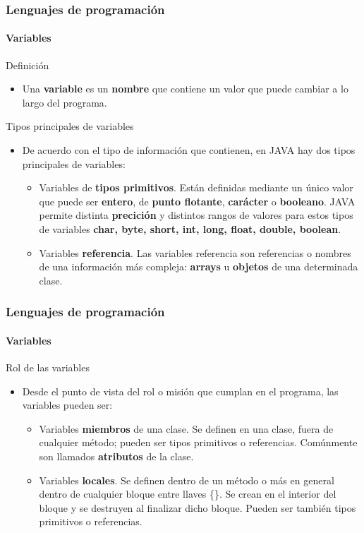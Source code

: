\documentclass{beamer}
\begin{document}
		\begin{frame}
			\frametitle{Lenguajes de programaci\'on}
			\framesubtitle{Variables}

			{\scriptsize
			\begin{exampleblock}{Definici\'on}
				\begin{itemize}
  					\item Una \textbf{variable} es un \textbf{nombre} que contiene un valor que puede cambiar a lo largo del programa.
				\end{itemize}
			\end{exampleblock}

			\begin{block}{Tipos principales de variables}
				\begin{itemize}
					\item De acuerdo con el tipo de informaci\'on que contienen, en JAVA hay dos tipos principales de variables:
					\begin{itemize}
						\item {\scriptsize Variables de \textbf{tipos primitivos}. Est\'an definidas mediante un \'unico valor que puede ser \textbf{entero}, de \textbf{punto flotante}, \textbf{car\'acter} o \textbf{booleano}. JAVA permite distinta \textbf{precici\'on} y distintos rangos de valores para estos tipos de variables \textbf{char, byte, short, int, long, float, double, boolean}.}
						\item {\scriptsize Variables \textbf{referencia}. Las variables referencia son referencias o nombres de una informaci\'on m\'as compleja: \textbf{arrays} u \textbf{objetos} de una determinada clase.}
					\end{itemize}
				\end{itemize}
			\end{block}
			}
		\end{frame}

		\begin{frame}
			\frametitle{Lenguajes de programaci\'on}
			\framesubtitle{Variables}

			\begin{block}{Rol de las variables}
				\begin{itemize}
					\item Desde el punto de vista del rol o misi\'on que cumplan en el programa, las variables pueden ser:
					\begin{itemize}
						\item Variables \textbf{miembros} de una clase. Se definen en una clase, fuera de cualquier m\'etodo; pueden ser tipos primitivos o referencias. Com\'unmente son llamados \textbf{atributos} de la clase.
						\item Variables \textbf{locales}. Se definen dentro de un m\'etodo o m\'as en general dentro de cualquier bloque entre llaves \{\}. Se crean en el interior del bloque y se destruyen al finalizar dicho bloque. Pueden ser tambi\'en tipos primitivos o referencias.
					\end{itemize}
				\end{itemize}
			\end{block}
		\end{frame}
\end{document}

